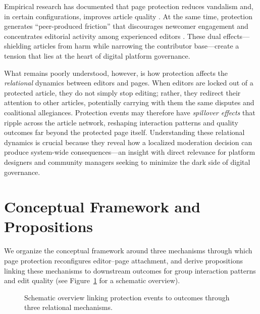 \documentclass[11pt]{article}
\begin{document}
Empirical research has documented that page protection reduces vandalism and, in certain configurations, improves article quality \citep{Ruprechter2025}. At the same time, protection generates ``peer-produced friction'' that discourages newcomer engagement and concentrates editorial activity among experienced editors \citep{Ajmani2023}. These dual effects---shielding articles from harm while narrowing the contributor base---create a tension that lies at the heart of digital platform governance.

What remains poorly understood, however, is how protection affects the \emph{relational} dynamics between editors and pages. When editors are locked out of a protected article, they do not simply stop editing; rather, they redirect their attention to other articles, potentially carrying with them the same disputes and coalitional allegiances. Protection events may therefore have \emph{spillover effects} \citep{Sinclair2012} that ripple across the article network, reshaping interaction patterns and quality outcomes far beyond the protected page itself. Understanding these relational dynamics is crucial because they reveal how a localized moderation decision can produce system-wide consequences---an insight with direct relevance for platform designers and community managers seeking to minimize the dark side of digital governance.


\section{Conceptual Framework and Propositions}

We organize the conceptual framework around three mechanisms through which page protection reconfigures editor--page attachment, and derive propositions linking these mechanisms to downstream outcomes for group interaction patterns and edit quality (see Figure~\ref{fig:model} for a schematic overview).

\begin{figure}[h!]
\centering
{}
\caption{Schematic overview linking protection events to outcomes through three relational mechanisms.}
\label{fig:model}
\end{figure}
\end{document}
